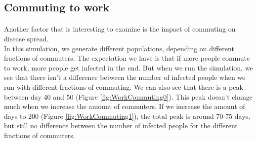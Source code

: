 \documentclass[runningheads]{llncs}
\begin{document}
\newpage

\subsection{Commuting to work}

\paragraph{} Another factor that is interesting to examine is the impact of commuting on disease spread. \\
In this simulation, we generate different populations, depending on different fractions of commuters. The expectation we have is that if more people commute to work, more people get infected in the end. But when we run the simulation, we see that there isn't a difference between the number of infected people when we run with different fractions of commuting. We can also see that there is a peak between day 40 and 50 (Figure \ref{fig:WorkCommuting0}). This peak doesn't change much when we increase the amount of commuters. If we increase the amount of days to 200 (Figure \ref{fig:WorkCommuting1}), the total peak is around 70-75 days, but still no difference between the number of infected people for the different fractions of commuters. 
\end{document}
